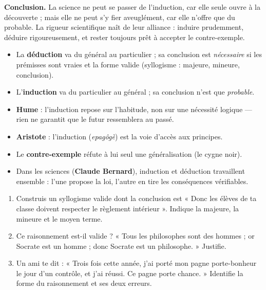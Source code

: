 \documentclass[11pt]{article}
\begin{document}
\begin{exoresolu}
\textbf{Conclusion.} La science ne peut se passer de l'induction, car elle seule ouvre à la découverte ; mais elle ne peut s'y fier aveuglément, car elle n'offre que du probable. La rigueur scientifique naît de leur alliance : induire prudemment, déduire rigoureusement, et rester toujours prêt à accepter le contre-exemple.
\end{exoresolu}

\begin{aretenir}
\begin{itemize}
\item La \textbf{déduction} va du général au particulier ; sa conclusion est \emph{nécessaire} si les prémisses sont vraies et la forme valide (syllogisme : majeure, mineure, conclusion).
\item L'\textbf{induction} va du particulier au général ; sa conclusion n'est que \emph{probable}.
\item \textbf{Hume} : l'induction repose sur l'habitude, non sur une nécessité logique — rien ne garantit que le futur ressemblera au passé.
\item \textbf{Aristote} : l'induction (\emph{epagôgè}) est la voie d'accès aux principes.
\item Le \textbf{contre-exemple} réfute à lui seul une généralisation (le cygne noir).
\item Dans les sciences (\textbf{Claude Bernard}), induction et déduction travaillent ensemble : l'une propose la loi, l'autre en tire les conséquences vérifiables.
\end{itemize}
\end{aretenir}

\begin{exercice}
\begin{enumerate}
\item Construis un syllogisme valide dont la conclusion est « Donc les élèves de ta classe doivent respecter le règlement intérieur ». Indique la majeure, la mineure et le moyen terme.
\item Ce raisonnement est-il valide ? « Tous les philosophes sont des hommes ; or Socrate est un homme ; donc Socrate est un philosophe. » Justifie.
\item Un ami te dit : « Trois fois cette année, j'ai porté mon pagne porte-bonheur le jour d'un contrôle, et j'ai réussi. Ce pagne porte chance. » Identifie la forme du raisonnement et ses deux erreurs.
\end{enumerate}
\end{exercice}
\end{document}
